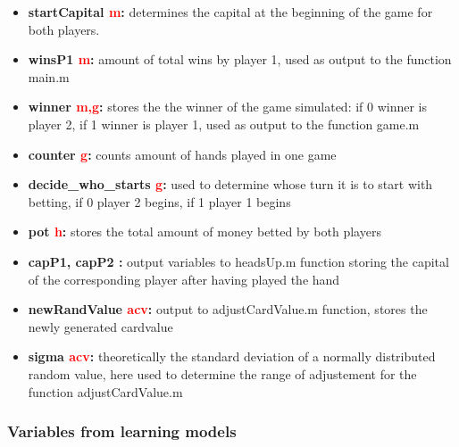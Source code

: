 \documentclass[11pt]{article}
\begin{document}
\begin{itemize}
\item	\textbf{startCapital \textcolor{red}{m}:} determines the capital at the beginning of the game for both players. \\

\item	\textbf{winsP1 \textcolor{red}{m}:} amount of total wins by player 1, used as output to the function main.m  \\

\item	\textbf{winner \textcolor{red}{m,g}:} stores the the winner of the game simulated: if 0 winner is player 2, if 1 winner is player 1, used as output to the function game.m\\

\item	\textbf{counter \textcolor{red}{g}:} counts amount of hands played in one game \\

\item	\textbf{decide\_who\_starts \textcolor{red}{g}:} used to determine whose turn it is to start with betting, if 0 player 2 begins, if 1 player 1 begins  \\

\item	\textbf{pot \textcolor{red}{h}:}  stores the total amount of money betted by both players\\

\item	\textbf{capP1, capP2 \textcolor{red}{}:} output variables to headsUp.m function storing the capital of the corresponding player after having played the hand\\

\item	\textbf{newRandValue \textcolor{red}{acv}:} output to adjustCardValue.m function, stores the newly generated cardvalue  \\

\item	\textbf{sigma \textcolor{red}{acv}:} theoretically the standard deviation of a normally distributed random value, here used to determine the range of adjustement for the function adjustCardValue.m \\

\end{itemize}

\subsubsection{Variables from learning models}
\end{document}
